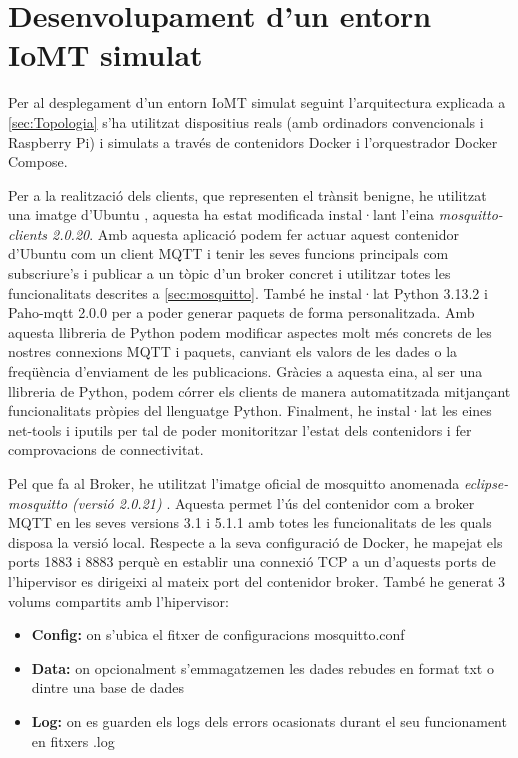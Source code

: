 \chapter{Desenvolupament d’un entorn IoMT simulat}
Per al desplegament d’un entorn IoMT simulat seguint l’arquitectura explicada a \ref{sec:Topologia} s'ha utilitzat dispositius reals (amb ordinadors convencionals i Raspberry Pi) i simulats a través de contenidors Docker i l’orquestrador Docker Compose.

Per a la realització dels clients, que representen el trànsit benigne, he utilitzat una imatge d’Ubuntu \cite{ubuntuimg}, aquesta ha estat modificada instal·lant l'eina \textit{mosquitto-clients 2.0.20}. Amb aquesta aplicació podem fer actuar aquest contenidor d'Ubuntu com un client MQTT i tenir les seves funcions principals com subscriure’s i publicar a un tòpic d’un broker concret i utilitzar totes les funcionalitats descrites a \ref{sec:mosquitto}. També he instal·lat Python 3.13.2 i Paho-mqtt 2.0.0 \cite{pahoexp} per a poder generar paquets de forma personalitzada. Amb aquesta llibreria de Python podem modificar aspectes molt més concrets de les nostres connexions MQTT i paquets, canviant els valors de les dades o la freqüència d’enviament de les publicacions. Gràcies a aquesta eina, al ser una llibreria de Python, podem córrer els clients de manera automatitzada mitjançant funcionalitats pròpies del llenguatge Python. Finalment, he instal·lat les eines net-tools i iputils per tal de poder monitoritzar l’estat dels contenidors i fer comprovacions de connectivitat.

Pel que fa al Broker, he utilitzat l’imatge oficial de mosquitto anomenada \textit{eclipse-mosquitto (versió 2.0.21)} \cite{mosquittoimg}. Aquesta permet l’ús del contenidor com a broker MQTT en les seves versions 3.1 i 5.1.1 amb totes les funcionalitats de les quals disposa la versió local. Respecte a la seva configuració de Docker, he mapejat els ports 1883 i 8883 perquè en establir una connexió TCP a un d’aquests ports de l'hipervisor es dirigeixi al mateix port del contenidor broker. També he generat 3 volums compartits amb l'hipervisor:
\begin{itemize}
    \item \textbf{Config:} on s’ubica el fitxer de configuracions mosquitto.conf
    \item \textbf{Data:} on opcionalment s'emmagatzemen les dades rebudes en format txt o dintre una base de dades
    \item \textbf{Log:} on es guarden els logs dels errors ocasionats durant el seu funcionament en fitxers .log
\end{itemize} 

